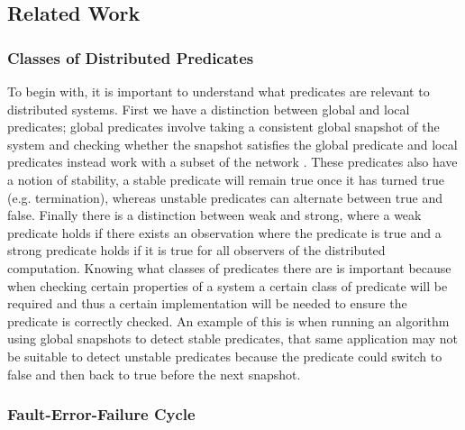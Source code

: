 \subsection{Related Work}

\subsubsection{Classes of Distributed Predicates}

To begin with, it is important to understand what predicates are relevant to distributed systems. First we have a distinction between global and local predicates; global predicates involve taking a consistent global snapshot of the system and checking whether the snapshot satisfies the global predicate \cite{277788} and local predicates instead work with a subset of the network \cite{553309}. These predicates also have a notion of stability, a stable predicate will remain true once it has turned true (e.g. termination), whereas unstable predicates can alternate between true and false. Finally there is a distinction between weak and strong, where a weak predicate holds if there exists an observation where the predicate is true and a strong predicate holds if it is true for all observers of the distributed computation\cite{553309,Cooper:1991:CDG:127695.122774}. Knowing what classes of predicates there are is important because when checking certain properties of a system a certain class of predicate will be required and thus a certain implementation will be needed to ensure the predicate is correctly checked. An example of this is when running an algorithm using global snapshots to detect stable predicates, that same application may not be suitable to detect unstable predicates because the predicate could switch to false and then back to true before the next snapshot.

\subsubsection{Fault-Error-Failure Cycle}

